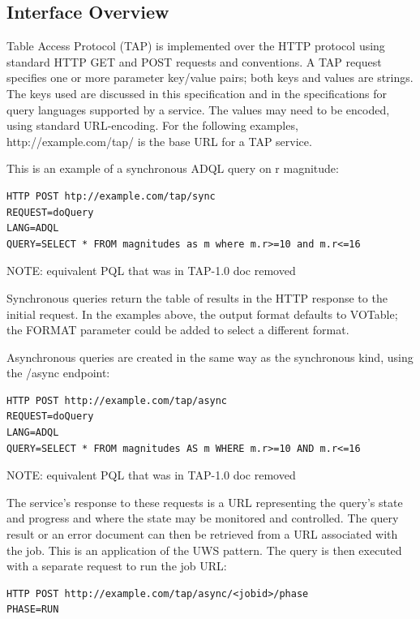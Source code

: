 \documentclass[11pt,a4paper]{ivoa}
\begin{document}
\subsection{Interface Overview}
Table Access Protocol (TAP) is implemented over the HTTP protocol using standard 
HTTP GET and POST requests and conventions. A TAP request specifies one or more 
parameter key/value pairs; both keys and values are strings. The keys used are 
discussed in this specification and in the specifications for query languages 
supported by a service. The values may need to be encoded, using standard 
URL-encoding. For the following examples, http://example.com/tap/ is the base 
URL for a TAP service.

This is an example of a synchronous ADQL query on r magnitude:

\begin{verbatim}
HTTP POST htp://example.com/tap/sync
REQUEST=doQuery
LANG=ADQL
QUERY=SELECT * FROM magnitudes as m where m.r>=10 and m.r<=16
\end{verbatim}

NOTE: equivalent PQL that was in TAP-1.0 doc removed

Synchronous queries return the table of results in the HTTP response to the 
initial request. In the examples above, the output format defaults to VOTable; 
the FORMAT parameter could be added to select a different format.

Asynchronous queries are created in the same way as the synchronous kind, using 
the /async endpoint:

\begin{verbatim}
HTTP POST http://example.com/tap/async
REQUEST=doQuery
LANG=ADQL
QUERY=SELECT * FROM magnitudes AS m WHERE m.r>=10 AND m.r<=16
\end{verbatim}

NOTE: equivalent PQL that was in TAP-1.0 doc removed
 
The service's response to these requests is a URL representing the query's state 
and progress and where the state may be monitored and controlled. The query 
result or an error document can then be retrieved from a URL associated with the 
job. This is an application of the UWS pattern. The query is then executed 
with a separate request to run the job URL:

\begin{verbatim}
HTTP POST http://example.com/tap/async/<jobid>/phase
PHASE=RUN
\end{verbatim}
\end{document}
